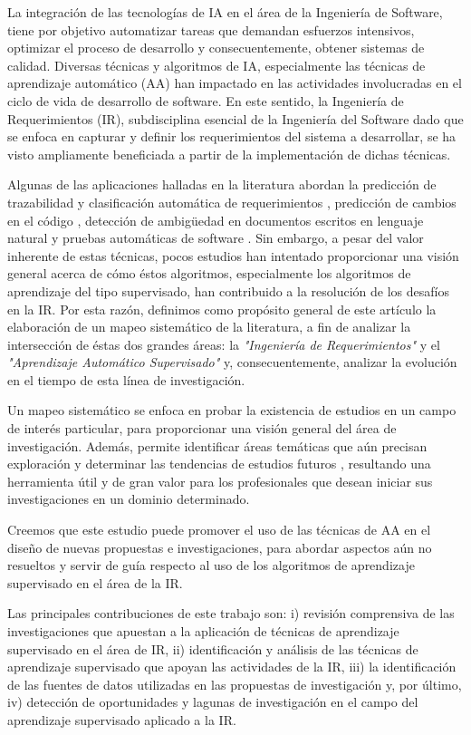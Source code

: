 \documentclass[journal]{IEEEtran}
\begin{document}
La integración de las tecnologías de IA en el área de la Ingeniería de Software, tiene por objetivo automatizar tareas que demandan esfuerzos intensivos, optimizar el proceso de desarrollo y consecuentemente, obtener sistemas de calidad. Diversas técnicas y algoritmos de IA, especialmente las técnicas de aprendizaje automático (AA) han impactado en las actividades involucradas en el ciclo de vida de desarrollo de software. En este sentido, la Ingeniería de Requerimientos (IR), subdisciplina esencial de la Ingeniería del Software dado que se enfoca en capturar y definir los requerimientos del sistema a desarrollar, se ha visto ampliamente beneficiada a partir de la implementación de dichas técnicas. 

Algunas de las aplicaciones halladas en la literatura abordan la predicción de trazabilidad y clasificación automática de requerimientos \cite{Li201725}, predicción de cambios en el código \cite{giger2012can}, detección de ambigüedad en documentos escritos en lenguaje natural \cite{yang2010extending} y pruebas automáticas de software \cite{Felbinger201623}. Sin embargo, a pesar del valor inherente de estas técnicas, pocos estudios han intentado proporcionar una visión general acerca de cómo éstos algoritmos, especialmente los algoritmos de aprendizaje del tipo supervisado, han contribuido a la resolución de los desafíos en la IR. Por esta razón, definimos como propósito general de este artículo la elaboración de un mapeo sistemático de la literatura, a fin de analizar la intersección de éstas dos grandes áreas: la \textit{"Ingeniería de Requerimientos"} y el \textit{"Aprendizaje Automático Supervisado"} y, consecuentemente, analizar la evolución en el tiempo de esta línea de investigación. 

Un mapeo sistemático se enfoca en probar la existencia de estudios en un campo de interés particular, para proporcionar una visión general del área de investigación. Además, permite identificar áreas temáticas que aún precisan exploración y determinar las tendencias de estudios futuros \cite{petersen2008systematic}, resultando una herramienta útil y de gran valor para los profesionales que desean iniciar sus investigaciones en un dominio determinado.

Creemos que este estudio puede promover el uso de las técnicas de AA en el diseño de nuevas propuestas e investigaciones, para abordar aspectos aún no resueltos y servir de guía respecto al uso de los algoritmos de aprendizaje supervisado en el área de la IR.

Las principales contribuciones de este trabajo son: i) revisión comprensiva de las investigaciones que apuestan a la aplicación de técnicas de aprendizaje supervisado en el área de IR, ii) identificación y análisis de las técnicas de aprendizaje supervisado que apoyan las actividades de la IR, iii) la identificación de las fuentes de datos utilizadas en las propuestas de investigación y, por último, iv) detección de oportunidades y lagunas de investigación en el campo del aprendizaje supervisado aplicado a la IR.
\end{document}
